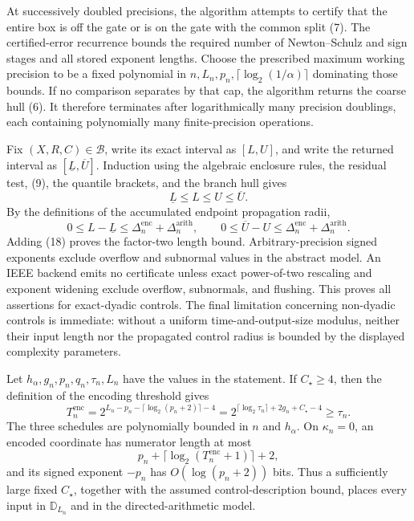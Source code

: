 At successively doubled precisions, the algorithm attempts to certify that the
entire box is off the gate or is on the gate with the common split (7).  The
certified-error recurrence bounds the required number of Newton--Schulz and sign
stages and all stored exponent lengths.  Choose the prescribed maximum working
precision to be a fixed polynomial in
\(n,L_n,p_n,\lceil\log_2(1/\alpha)\rceil\) dominating those bounds.  If no
comparison separates by that cap, the algorithm returns the coarse hull (6).
It therefore terminates after logarithmically many precision doublings, each
containing polynomially many finite-precision operations.

Fix \((X,R,C)\in\mathcal B\), write its exact interval as \([L,U]\), and write
the returned interval as \([\underline L,\overline U]\).  Induction using the
algebraic enclosure rules, the residual test, (9), the quantile brackets, and the
branch hull gives
\[
\underline L\le L\le U\le\overline U.                               \tag{17}
\]
By the definitions of the accumulated endpoint propagation radii,
\[
0\le L-\underline L\le
\Delta_n^{\mathrm{enc}}+\Delta_n^{\mathrm{arith}},
\qquad
0\le\overline U-U\le
\Delta_n^{\mathrm{enc}}+\Delta_n^{\mathrm{arith}}.                   \tag{18}
\]
Adding (18) proves the factor-two length bound.  Arbitrary-precision signed
exponents exclude overflow and subnormal values in the abstract model.  An IEEE
backend emits no certificate unless exact power-of-two rescaling and exponent
widening exclude overflow, subnormals, and flushing.  This proves all assertions
for exact-dyadic controls.  The final limitation concerning non-dyadic controls
is immediate: without a uniform time-and-output-size modulus, neither their
input length nor the propagated control radius is bounded by the displayed
complexity parameters.

Let \(h_\alpha,g_n,p_n,q_n,\tau_n,L_n\) have the values in the statement.  If
\(C_\star\ge4\), then the definition of the encoding threshold gives
\[
T_n^{\mathrm{enc}}
=2^{L_n-p_n-\lceil\log_2(p_n+2)\rceil-4}
=2^{\lceil\log_2\tau_n\rceil+2g_n+C_\star-4}
\ge\tau_n.                                                            \tag{1}
\]
The three schedules are polynomially bounded in \(n\) and
\(h_\alpha\).  On \(\kappa_n=0\), an encoded coordinate has numerator length
at most
\[
p_n+\lceil\log_2(T_n^{\mathrm{enc}}+1)\rceil+2,
\]
and its signed exponent \(-p_n\) has \(O(\log(p_n+2))\) bits.  Thus a sufficiently
large fixed \(C_\star\), together with the assumed control-description bound,
places every input in \(\mathbb D_{L_n}\) and in the directed-arithmetic model.

